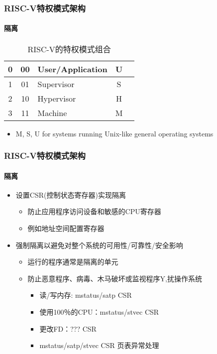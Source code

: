 \begin{frame}
		\frametitle{RISC-V特权模式架构}
		\framesubtitle{隔离}
\begin{table}[h]
	\caption{RISC-V的特权模式组合}
 	\centering
 	\begin{tabular}{|c|c|l|c|l|}
 	\hline
	0 & 00 & User/Application & U \\\hline
	1 & 01 & Supervisor & S \\\hline
	2 & 10 & Hypervisor & H \\\hline
	3 & 11 & Machine & M \\\hline
   \end{tabular}
   \end{table}
\begin{itemize}
	
	\item M, S, U  for systems running Unix-like general operating systems
\end{itemize}


\end{frame}




\begin{frame}
	\frametitle{RISC-V特权模式架构}
	\framesubtitle{隔离}

	\begin{itemize}
		\item 设置CSR(控制状态寄存器)实现隔离
		\begin{itemize}
			\item 防止应用程序访问设备和敏感的CPU寄存器
			\item 例如地址空间配置寄存器
		\end{itemize} 
	\end{itemize}

	\begin{itemize}
		\item 强制隔离以避免对整个系统的可用性/可靠性/安全影响
		\begin{itemize}
		\item 运行的程序通常是隔离的单元
		\item 防止恶意程序、病毒、木马破坏或监视程序Y,扰操作系统	
			\begin{itemize}
			\item 读/写内存: mstatus/satp CSR
			\item 使用100％的CPU：mstatus/stvec CSR
			\item 更改FD：??? CSR
			\pause

			 	\item mstatus/satp/stvec CSR 页表异常处理

			\end{itemize}
		\end{itemize}
	\end{itemize}

\end{frame}



